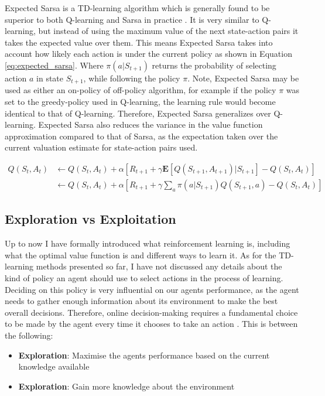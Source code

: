 \documentclass[../dissertation.tex]{subfiles}
\begin{document}
Expected Sarsa is a TD-learning algorithm which is generally found to be superior to both Q-learning and Sarsa in practice \cite{sutton2011reinforcement}. It is very similar to Q-learning, but instead of using the maximum value of the next state-action pairs it takes the expected value over them. This means Expected Sarsa takes into account how likely each action is under the current policy as shown in Equation \ref{eq:expected_sarsa}. Where $\pi(a | S_{t+1})$ returns the probability of selecting action $a$ in state $S_{t+1}$, while following the policy $\pi$. Note, Expected Sarsa may be used as either an on-policy of off-policy algorithm, for example if the policy $\pi$ was set to the greedy-policy used in Q-learning, the learning rule would become identical to that of Q-learning. Therefore, Expected Sarsa generalizes over Q-learning. Expected Sarsa also reduces the variance in the value function approximation compared to that of Sarsa, as the expectation taken over the current valuation estimate for state-action pairs used.

\begin{align}
Q(S_t, A_t) &  \leftarrow Q(S_t, A_t) + \alpha [R_{t+1} + \gamma \mathbf{E}[Q(S_{t+1}, A_{t+1}) | S_{t+1}] - Q(S_t, A_t)]\\
 & \leftarrow Q(S_t, A_t) + \alpha [R_{t+1} + \gamma \sum_a \pi(a| S_{t+1}) Q(S_{t+1}, a) - Q(S_t, A_t)]
 \label{eq:expected_sarsa}
\end{align}

\subsection{Exploration vs Exploitation}

Up to now I have formally introduced what reinforcement learning is, including what the optimal value function is and different ways to learn it. As for the TD-learning methods presented so far, I have not discussed any details about the kind of policy an agent should use to select actions in the process of learning. Deciding on this policy is very influential on our agents performance, as the agent needs to gather enough information about its environment to make the best overall decisions. Therefore, online decision-making requires a fundamental choice to be made by the agent every time it chooses to take an action \cite{exploration_vs_exploitation}. This is between the following:

\begin{itemize}
\item \textbf{Exploration}: Maximise the agents performance based on the current knowledge available
\item \textbf{Exploration}: Gain more knowledge about the environment
\end{itemize}
\end{document}
